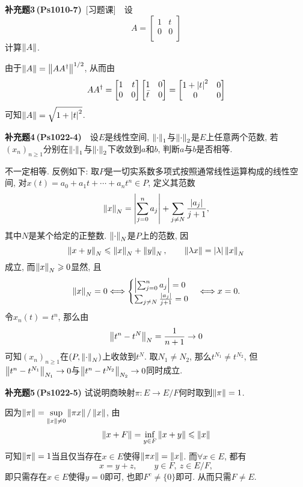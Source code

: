 	\textbf{补充题3\,(Ps1010-7)}\ [习题课]\ \ 设
	\[
	A=\begin{bmatrix}1 & t\\0 & 0\\\end{bmatrix} 
	\]
	计算$ \left\| A \right\| $.
	\begin{Solution}
	由于$ \left\| A \right\|=\left\| AA^\dagger \right\|^{1/2} $, 从而由
	\[
	AA^\dagger=\begin{bmatrix}1&t\\0&0\\\end{bmatrix}
	\begin{bmatrix}1&0\\\bar{t}&0\\\end{bmatrix}=\begin{bmatrix}
	1+\left| t \right| ^2&0\\0&0\\
	\end{bmatrix}
	\]
	可知$ \left\| A \right\|=\sqrt{1+\left| t \right| ^2} $.
	\end{Solution}	

	\textbf{补充题4\,(Ps1022-4)}\ \ 设$ E $是线性空间, $ \left\| \cdot \right\|_1 $与$ \left\| \cdot \right\|_2 $是$ E $上任意两个范数, 若$ (x_n)_{n\geqslant 1} $分别在$ \left\| \cdot \right\|_1 $与$ \left\| \cdot \right\|_2 $下收敛到$ a $和$ b $, 判断$ a $与$ b $是否相等.
	\begin{Solution}
	不一定相等. 反例如下: 取$ P $是一切实系数多项式按照通常线性运算构成的线性空间, 对$ x(t)=a_0+a_1t+\cdots+a_nt^n\in P $, 定义其范数
	\[
	\left\| x \right\|_N=\left| \sum_{j=0}^na_j \right| +\sum_{j\ne N}\frac{\left| a_j \right| }{j+1},
	\]
	其中$ N $是某个给定的正整数. $ \left\| \cdot \right\|_N $是$ P $上的范数, 因
	\[
	\left\| x+y \right\|_N\leqslant\left\| x \right\|_N+\left\| y \right\|_N,\qquad\left\| \lambda x \right\|=\left| \lambda \right| \left\| x \right\|_N
	\]
	成立, 而$ \left\| x \right\|_N\geqslant 0 $显然, 且
	\[
	\left\| x \right\|_N=0\Longleftrightarrow\begin{cases}
	\left| \sum_{j=0}^na_j \right| =0\\\sum_{j\ne N}\frac{\left| a_j \right| }{j+1}=0
	\end{cases}\Longleftrightarrow x=0.
	\]
	令$ x_n(t)=t^n $, 那么由
	\[
	\left\| t^n-t^N \right\|_N=\frac{1}{n+1}\to 0
	\]
	可知$ (x_n)_{n\geqslant 1} $在$ (P,\left\| \cdot \right\|_N) $上收敛到$ t^N $. 取$ N_1\ne N_2 $, 那么$ t^{N_1}\ne t^{N_2} $, 但$ \left\| t^n-t^{N_1} \right\|_{N_1}\to 0 $与$ \left\| t^n-t^{N_2} \right\|_{N_2}\to 0 $同时成立.
	\end{Solution}
	
	\textbf{补充题5\,(Ps1022-5)} 试说明商映射$ \pi : E\to E/F $何时取到$ \left\| \pi \right\|=1 $.
	\begin{Solution}
	因为$ \left\| \pi \right\|=\sup\limits_{\left\| x \right\|\ne 0}\left\| \pi x \right\|/\left\| x \right\| $, 由
	\[
	\left\| x+F \right\|=\inf_{y\in F}\left\| x+y \right\|\leqslant \left\| x \right\|
	\]
	可知$ \left\| \pi \right\|=1 $当且仅当存在$ x\in E $使得$ \left\| \pi x \right\|=\left\| x \right\| $. 而$ \forall x\in E $, 都有
	\[
	x=y+z,\qquad y\in F,\ z\in E/F,
	\]
	即只需存在$ x\in E $使得$ y=0 $即可, 也即$ F^c\ne\{ 0 \} $即可. 从而只需$ F\ne E $.
	\end{Solution}

